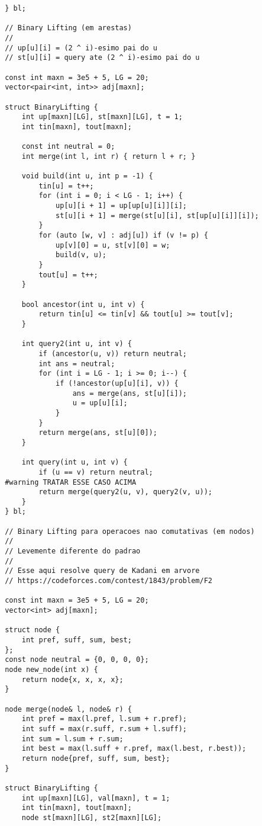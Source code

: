 \documentclass[11pt, a4paper, twoside]{article}
\begin{document}
\begin{lstlisting}
 } bl;
 
 // Binary Lifting (em arestas)
 //
 // up[u][i] = (2 ^ i)-esimo pai do u
 // st[u][i] = query ate (2 ^ i)-esimo pai do u
 
 const int maxn = 3e5 + 5, LG = 20;
 vector<pair<int, int>> adj[maxn];
 
 struct BinaryLifting {
     int up[maxn][LG], st[maxn][LG], t = 1;
     int tin[maxn], tout[maxn];
 
     const int neutral = 0;
     int merge(int l, int r) { return l + r; }
 
     void build(int u, int p = -1) {
         tin[u] = t++;
         for (int i = 0; i < LG - 1; i++) {
             up[u][i + 1] = up[up[u][i]][i];
             st[u][i + 1] = merge(st[u][i], st[up[u][i]][i]);
         }
         for (auto [w, v] : adj[u]) if (v != p) {
             up[v][0] = u, st[v][0] = w;
             build(v, u);
         }
         tout[u] = t++;
     }
 
     bool ancestor(int u, int v) {
         return tin[u] <= tin[v] && tout[u] >= tout[v];
     }
 
     int query2(int u, int v) {
         if (ancestor(u, v)) return neutral;
         int ans = neutral;
         for (int i = LG - 1; i >= 0; i--) {
             if (!ancestor(up[u][i], v)) {
                 ans = merge(ans, st[u][i]);
                 u = up[u][i];
             }
         }
         return merge(ans, st[u][0]);
     }
 
     int query(int u, int v) { 
         if (u == v) return neutral;
 #warning TRATAR ESSE CASO ACIMA
         return merge(query2(u, v), query2(v, u));
     }
 } bl;
 
 // Binary Lifting para operacoes nao comutativas (em nodos)
 //
 // Levemente diferente do padrao
 //
 // Esse aqui resolve query de Kadani em arvore
 // https://codeforces.com/contest/1843/problem/F2
 
 const int maxn = 3e5 + 5, LG = 20;
 vector<int> adj[maxn];
 
 struct node {
     int pref, suff, sum, best;
 };
 const node neutral = {0, 0, 0, 0};
 node new_node(int x) {
     return node{x, x, x, x};
 }
 
 node merge(node& l, node& r) {
     int pref = max(l.pref, l.sum + r.pref);
     int suff = max(r.suff, r.sum + l.suff);
     int sum = l.sum + r.sum;
     int best = max(l.suff + r.pref, max(l.best, r.best));
     return node{pref, suff, sum, best};
 }
 
 struct BinaryLifting {
     int up[maxn][LG], val[maxn], t = 1;
     int tin[maxn], tout[maxn];
     node st[maxn][LG], st2[maxn][LG];
 

\end{lstlisting}
\end{document}
